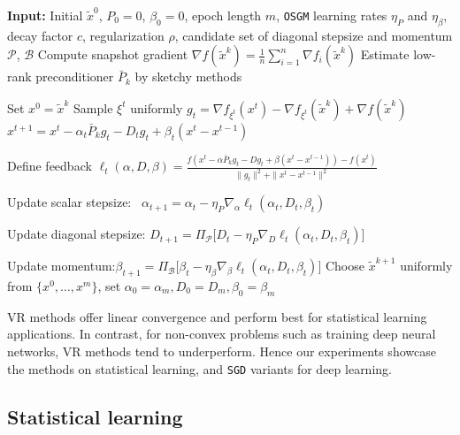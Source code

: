 \documentclass{article}
\theoremstyle{definition}
\newcommand{\os}{\texttt{OSGM}}
\newcommand{\osk}{\texttt{OSGM-SketchySVRG}}
\newcommand{\sgd}{\texttt{SGD}}
\begin{document}
\begin{algorithm}[ht!]
\caption{{\osk}}
\label{alg:osgm-sketchy}
\begin{algorithmic}[1]
\STATE \textbf{Input:} Initial $\tilde{x}^0$, $P_0=0$, $\beta_0=0$, epoch length $m$, {\os} learning rates $\eta_P$ and $\eta_{\beta}$, decay factor $c$, regularization $\rho$, candidate set of diagonal stepsize and momentum $\mathcal{P}$, $\mathcal{B}$
    \STATE Compute snapshot gradient $\nabla f(\tilde{x}^k) = \tfrac1n\sum_{i=1}^n \nabla f_i(\tilde{x}^k)$
    \STATE Estimate low-rank preconditioner $\bar P_k$ by sketchy methods
    
    \STATE Set $x^0 = \tilde{x}^k$
        \STATE Sample $\xi^t$ uniformly
        \STATE
        $
            g_t = \nabla f_{\xi^t}(x^t) - \nabla f_{\xi^t}(\tilde{x}^k) + \nabla f(\tilde{x}^k)
        $
        \STATE
        $x^{t+1} = x^t
        - \alpha_{t} \bar{P}_k g_t
        - D_{t} g_t
        + \beta_{t}(x^t - x^{t-1})$

        \STATE Define feedback $\ell_{t}(\alpha, D, \beta)=\tfrac{f(x^t- \alpha \bar{P}_k g_t - D g_t+ \beta(x^t - x^{t-1})) - f(x^t)}{\|g_t\|^2 + \|x^t - x^{t-1}\|^2}$

        \STATE Update scalar stepsize: \quad \, $\alpha_{t+1} = \alpha_{t} - \eta_P \nabla_{\alpha} \ell_{t}(\alpha_t, D_t, \beta_t)$

        \STATE Update diagonal stepsize: $D_{t+1} = \Pi_{\mathcal{P}}\big[D_{t} - \eta_P \nabla_D \ell_{t}(\alpha_t, D_t, \beta_t)\big]$

        \STATE Update momentum:\qquad \quad $\beta_{t+1} = \Pi_{\mathcal{B}} \big[ \beta_{t} - \eta_{\beta} \nabla_{\beta} \ell_{t}(\alpha_t, D_t, \beta_t) \big]$
    \ENDFOR
    \STATE Choose $\tilde{x}^{k+1}$ uniformly from $\{x^0,\dots,x^m\}$, set $\alpha_0=\alpha_m, D_0=D_m, \beta_0=\beta_m$
\ENDFOR
\end{algorithmic}
\end{algorithm}


VR methods offer linear convergence and perform best for statistical learning applications. 
In contrast, for non-convex problems such as training deep neural networks, VR methods tend to underperform. Hence our experiments showcase the  methods on statistical learning, and  {\sgd} variants for deep learning.

\subsection{Statistical learning}
\end{document}
